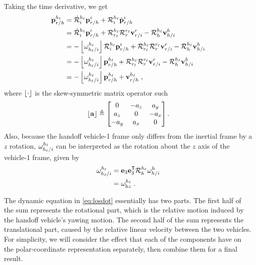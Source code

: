 Taking the time derivative, we get
\begin{align}
    \losxy[\dot] &= \Rotdot{i}{\hv}\p_{\TwrtH}^{i} +
                  \Rot{i}{\hv}\dot{\p}_{\TwrtH}^{i} \\
    \label{eq:vhhv}
    &= \Rotdot{i}{\hv}\p_{\TwrtH}^{i} +
       \Rot{\tv}{\hv}\Rot{\tb}{\tv}\vel_{\TwrtI}^{\tb} -
       \Rot{\hb}{\hv}\vel_{\HwrtI}^{\hb} \\
    &= -\skewmat{\angvel_{\HVwrtI}^\hv}\Rot{i}{\hv}\p_{\TwrtH}^{i} +
       \Rot{\tv}{\hv}\Rot{\tb}{\tv}\vel_{\TwrtI}^{\tb} -
       \Rot{\hb}{\hv}\vel_{\HwrtI}^{\hb} \\
    &= -\skewmat{\angvel_{\HVwrtI}^\hv}\p_{\TwrtH}^\hv +
       \Rot{\tv}{\hv}\Rot{\tb}{\tv}\vel_{\TwrtI}^{\tb} -
       \Rot{\hb}{\hv}\vel_{\HwrtI}^{\hb} \\
    \label{eq:losdot}
    &= -\skewmat{\angvel_{\HVwrtI}^\hv}\losxy + \vel_{\TwrtH}^\hv \;,
\end{align}
where $\left\lfloor\cdot\right\rfloor$ is the skew-symmetric matrix operator such
\begin{equation}
  \left\lfloor\mathbf{a}\right\rfloor \triangleq \begin{bmatrix}
                                0 & -a_z & a_y \\
                                a_z & 0 & -a_x \\
                                -a_y & a_x & 0
                                \end{bmatrix}.
\end{equation}
Also, because the handoff vehicle-1 frame only differs from the inertial frame by a $z$ rotation, ${\mathbf{\omega}}_{{h_\ell}/i}^{h_\ell}$ can be interpreted as the rotation about the $z$ axis of the vehicle-1 frame, given by
\begin{align}
    \label{eq:omega_z}
    \angvel_{\HVwrtI}^\hv &= \e_3\e_3^\transpose\Rot{\hb}{\hv}\angvel_{\HBwrtI}^\hb \\
    &= \angvel_{\text{h}z}^\hv \;.
\end{align}

The dynamic equation in \eqref{eq:losdot} essentially has two parts.
The first half of the sum represents the rotational part, which is the relative motion induced by the handoff vehicle's yawing motion.
The second half of the sum represents the translational part, caused by the relative linear velocity between the two vehicles.
For simplicity, we will consider the effect that each of the components have on the polar-coordinate representation separately, then combine them for a final result.


